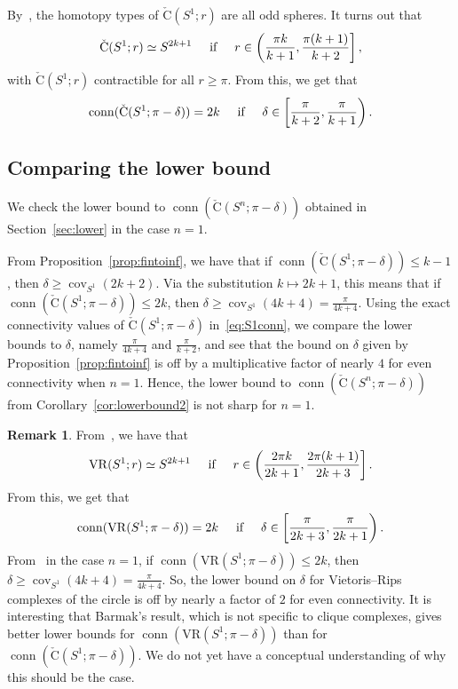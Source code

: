 \documentclass[11 pt,a4paper,twoside,reqno]{amsart}
\theoremstyle{definition}
\newtheorem{remark}[theorem]{Remark}
\newcommand{\vr}[2]{\mathrm{VR}(#1;#2)}
\newcommand{\cech}[2]{\mathrm{\check{C}}(#1;#2)}
\DeclareMathOperator{\conn}{conn}
\DeclareMathOperator{\cov}{cov}
\begin{document}
By~\cite[Theorem 9.8]{AA-VRS1}, the homotopy types of $\cech{S^1}{r}$ are all odd spheres.
It turns out that
\begin{equation}
\label{eq:S1cech}
\cech{S^1}{r} \simeq S^{2k+1} \hspace{5mm} \text{if} \hspace{5mm} r \in \left(\frac{\pi k}{k+1},\frac{\pi (k+1)}{k+2}\right],
\end{equation}
with $\cech{S^1}{r}$ contractible for all $r\ge \pi$.
From this, we get that
\begin{equation}
\label{eq:S1conn}
\conn(\cech{S^1}{\pi-\delta}) = 2k \hspace{5mm} \text{if} \hspace{5mm} \delta \in \left[\frac{\pi}{k+2},\frac{\pi}{k+1}\right).
\end{equation}



\subsection{Comparing the lower bound}
\label{ssec:checking-lower}

We check the lower bound to $\conn(\cech{S^n}{\pi-\delta})$ obtained in Section~\ref{sec:lower} in the case $n=1$.

From Proposition~\ref{prop:fintoinf}, we have that if $\conn(\cech{S^1}{\pi-\delta}) \le k-1$, then $\delta\ge\cov_{S^1}(2k+2)$.
Via the substitution $k\mapsto 2k+1$, this means that if $\conn(\cech{S^1}{\pi-\delta}) \le 2k$, then $\delta \ge \cov_{S^1}(4k+4) = \frac{\pi}{4k+4}$.
Using the exact connectivity values of $\cech{S^1}{\pi-\delta}$ in~\eqref{eq:S1conn}, we compare the lower bounds to $\delta$, namely $\frac{\pi}{4k+4}$ and $\frac{\pi}{k+2}$, and see that the bound on $\delta$ given by Proposition~\ref{prop:fintoinf} is off by a multiplicative factor of nearly $4$ for even connectivity when $n=1$.
Hence, the lower bound to $\conn(\cech{S^n}{\pi-\delta})$ from Corollary~\ref{cor:lowerbound2} is not sharp for $n=1$.

\begin{remark}
    From~\cite[Theorem 7.4]{AA-VRS1}, we have that 
    \[
\vr{S^1}{r} \simeq S^{2k+1} \hspace{5mm} \text{if} \hspace{5mm} r \in \left(\frac{2\pi k}{2k+1},\frac{2\pi (k+1)}{2k+3}\right].
\]
From this, we get that
\[
\conn(\vr{S^1}{\pi-\delta}) = 2k \hspace{5mm} \text{if} \hspace{5mm} \delta \in \left[\frac{\pi}{2k+3},\frac{\pi}{2k+1}\right).
\]
From~\cite[Claim 4.1]{ABV} in the case $n=1$, if $\conn(\vr{S^1}{\pi-\delta}) \le 2k$, then $\delta \ge \cov_{S^1}(4k+4) = \frac{\pi}{4k+4}$.
So, the lower bound on $\delta$ for Vietoris--Rips complexes of the circle is off by nearly a factor of $2$  for even connectivity.
It is interesting that Barmak's result, which is not specific to clique complexes, gives better lower bounds for $\conn(\vr{S^1}{\pi-\delta})$ than for $\conn(\cech{S^1}{\pi-\delta})$.
We do not yet have a conceptual understanding of why this should be the case.
\end{remark}
\end{document}
